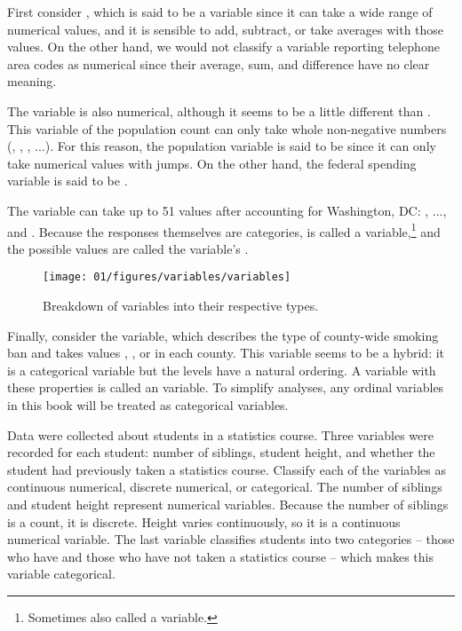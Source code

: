 First consider , which is said to be a  variable since it can take a wide range of numerical values, and it is sensible to add, subtract, or take averages with those values. On the other hand, we would not classify a variable reporting telephone area codes as numerical since their average, sum, and difference have no clear meaning.

The  variable is also numerical, although it seems to be a little different than . This variable of the population count can only take whole non-negative numbers (, , , ...). For this reason, the population variable is said to be  since it can only take numerical values with jumps. On the other hand, the federal spending variable is said to be .

The variable  can take up to 51 values after accounting for Washington, DC: , ..., and . Because the responses themselves are categories,  is called a  variable,\footnote{Sometimes also called a  variable.} and the possible values are called the variable's .

\begin{figure}
\centering
\texttt{[image: 01/figures/variables/variables]}
\caption{Breakdown of variables into their respective types.}
\label{variables}
\end{figure}

Finally, consider the  variable, which describes the type of county-wide smoking ban and takes values , , or  in each county. This variable seems to be a hybrid: it is a categorical variable but the levels have a natural ordering. A variable with these properties is called an  variable. To simplify analyses, any ordinal variables in this book will be treated as categorical variables.

\begin{example}{Data were collected about students in a statistics course. Three variables were recorded for each student: number of siblings, student height, and whether the student had previously taken a statistics course. Classify each of the variables as continuous numerical, discrete numerical, or categorical.}
The number of siblings and student height represent numerical variables. Because the number of siblings is a count, it is discrete. Height varies continuously, so it is a continuous numerical variable. The last variable classifies students into two categories -- those who have and those who have not taken a statistics course -- which makes this variable categorical.
\end{example}

